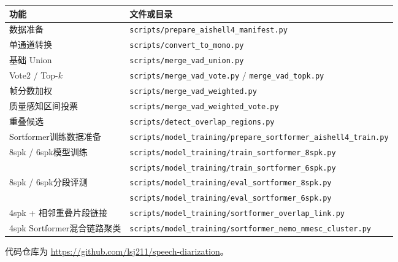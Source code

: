 \documentclass[UTF8,a4paper,10pt]{ctexart}
\begin{document}
\begin{table}[H]
\centering
\begin{tabular}{ll}
\toprule
功能 & 文件或目录\\
\midrule
数据准备 & \texttt{scripts/prepare\_aishell4\_manifest.py}\\
单通道转换 & \texttt{scripts/convert\_to\_mono.py}\\
基础 Union & \texttt{scripts/merge\_vad\_union.py}\\
Vote2 / Top-$k$ & \texttt{scripts/merge\_vad\_vote.py} / \texttt{merge\_vad\_topk.py}\\
帧分数加权 & \texttt{scripts/merge\_vad\_weighted.py}\\
质量感知区间投票 & \texttt{scripts/merge\_vad\_weighted\_vote.py}\\
重叠候选 & \texttt{scripts/detect\_overlap\_regions.py}\\
Sortformer训练数据准备 & \texttt{scripts/model\_training/prepare\_sortformer\_aishell4\_train.py}\\
8spk / 6spk模型训练 & \texttt{scripts/model\_training/train\_sortformer\_8spk.py} \\
&  \texttt{scripts/model\_training/train\_sortformer\_6spk.py}\\
8spk / 6spk分段评测 & \texttt{scripts/model\_training/eval\_sortformer\_8spk.py} \\
  &  \texttt{scripts/model\_training/eval\_sortformer\_6spk.py}\\
4spk + 相邻重叠片段链接 & \texttt{scripts/model\_training/sortformer\_overlap\_link.py}\\
4spk Sortformer混合链路聚类 & \texttt{scripts/model\_training/sortformer\_nemo\_nmesc\_cluster.py}\\

\bottomrule
\end{tabular}
\end{table}

代码仓库为
\url{https://github.com/lsj211/speech-diarization}。
\end{document}
